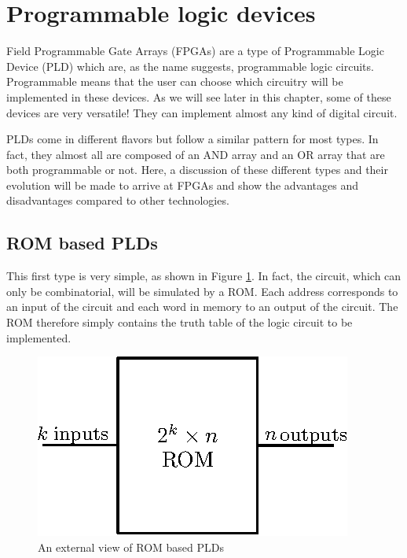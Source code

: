 \section{Programmable logic devices}

Field Programmable Gate Arrays (FPGAs) are a type of Programmable Logic Device (PLD) which are, as 
the name suggests, programmable logic circuits. Programmable means that the user can choose which 
circuitry will be implemented in these devices.  As we will see later in this chapter, some of 
these devices are very versatile! They can implement almost any kind of digital circuit.

PLDs come in different flavors but follow a similar pattern for most types. In fact, they almost all 
are composed of an AND array and an OR array that are both programmable or not. Here, a discussion 
of these different types and their evolution will be made to arrive at FPGAs and show the advantages 
and disadvantages compared to other technologies.

\subsection{ROM based PLDs}

This first type is very simple, as shown in Figure \ref{fig:fpga/pld_rom_external}. In fact, the 
circuit, which can only be combinatorial, will be simulated by a ROM. Each address corresponds to 
an input of the circuit and each word in memory to an output of the circuit. The ROM therefore 
simply contains the truth table of the logic circuit to be implemented.

\begin{figure}[H]
    \centering
    \includegraphics[scale=1.2]{Chapter1-Hardware/res/pld_rom_external}
    \caption{An external view of ROM based PLDs}
    \label{fig:fpga/pld_rom_external}
\end{figure}

